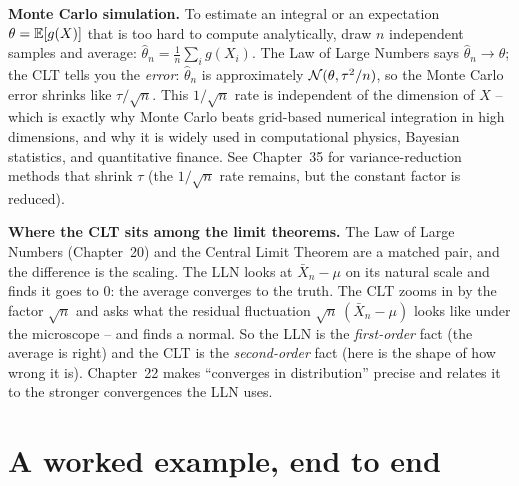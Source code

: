 \begin{applicationbox}
\textbf{Monte Carlo simulation.} To estimate an integral or an expectation
$\theta = \operatorname{\mathbb{E}}[g(X)]$ that is too hard to compute analytically, draw $n$ independent
samples and average: $\hat\theta_n = \frac1n \sum_i g(X_i)$. The Law of Large Numbers
says $\hat\theta_n \to \theta$; the CLT tells you the \emph{error}: $\hat\theta_n$ is
approximately $\mathcal{N}(\theta, \tau^2/n)$, so the Monte Carlo error shrinks like
$\tau/\sqrt n$. This $1/\sqrt n$ rate is independent of the dimension of $X$ -- which is
exactly why Monte Carlo beats grid-based numerical integration in high dimensions, and
why it is widely used in computational physics, Bayesian statistics, and quantitative
finance. See Chapter~35 for variance-reduction methods that shrink $\tau$
(the $1/\sqrt n$ rate remains, but the constant factor is reduced).
\end{applicationbox}

\begin{connectionbox}
\textbf{Where the CLT sits among the limit theorems.} The Law of Large Numbers
(Chapter~20) and the Central Limit Theorem are a matched pair, and the difference is the
scaling. The LLN looks at $\bar X_n - \mu$ on its natural scale and finds it goes to
$0$: the average converges to the truth. The CLT zooms in by the factor $\sqrt n$ and
asks what the residual fluctuation $\sqrt n\,(\bar X_n - \mu)$ looks like under the
microscope -- and finds a normal. So the LLN is the \emph{first-order} fact (the average
is right) and the CLT is the \emph{second-order} fact (here is the shape of how wrong it
is). Chapter~22 makes ``converges in distribution'' precise and
relates it to the stronger convergences the LLN uses.
\end{connectionbox}

\section{A worked example, end to end}
\label{ch21:worked}

